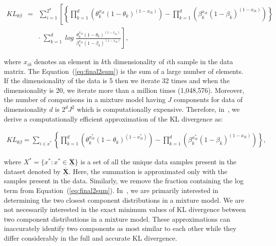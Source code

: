 \begin{eqnarray}
\label{eq:final2sum} 
KL_{\theta\beta} & = & \displaystyle \sum_{i=1}^{2^{{d}}} \left[ \left\{ \displaystyle \prod _{k=1}^{{d}}  \left(\theta_k^{x_{ik}}(1-\theta_{k})^{(1-x_{ik})} \right)  -\displaystyle \prod _{k=1}^{{d}} \left(  \beta_{k}^{x_{ik}}(1-\beta_{k})^{(1-x_{ik})} \right) \right\} \nonumber \right. \\ 
& & \left. \boldsymbol{\cdot} \; \displaystyle \sum_{k=1}^{{d}} \; log \; \frac{\theta_{k}^{x_{ik}} (1-\theta_{k})^{(1-x_{ik})}} { \beta_{k}^{x_{ik}}(1-\beta_{k})^{(1-x_{ik})}} \right],
\end{eqnarray}

where $x_{ik}$ denotes an element in
$k$th dimensionality of $i$th sample in the data matrix. The 
Equation~(\ref{eq:final2sum}) is the sum of a large number of elements. 
If the dimensionality of the data is 5 then we iterate 32 times and  
when the dimensionality is 20, we iterate more than a million times 
(1,048,576). Moreover, the number of comparisons in a mixture model
having $J$ components for data of dimensionality $d$ is $2^{d}J^{2}$ 
which is computationally expensive. Therefore, in~, we 
derive a computationally efficient approximation of the  KL divergence as:

\begin{eqnarray} 
\label{eq:symmcf}
KL_{\theta\beta}  =  \displaystyle \sum_{i \in x^{*} } \left\{ \displaystyle \prod _{k=1}^{{d}}  \left(\theta_k^{x^{*}_{ik}}(1-\theta_{k})^{(1-x^{*}_{ik})} \right) -\displaystyle \prod _{k=1}^{{d}} \left(  \beta_{k}^{x^{*}_{ik}}(1-\beta_{k})^{(1-x_{ik})} \right) \right\},
\end{eqnarray}

where 
$X^{*}=\{x^{*}:x^{*}\in \overline{\underline{\boldsymbol{X}}}\}$ 
is a set of all the unique data samples present in  the dataset
denoted by $\overline{\underline{\boldsymbol{X}}}$. 
Here, the summation is approximated only with  
the samples present in the data.  Similarly, we remove  the fraction 
containing the log term from Equation~(\ref{eq:final2sum}). 
In~, we are primarily interested 
in determining  the two closest component distributions in a mixture 
model. We are not necessarily interested in the exact minimum values
of  KL divergence between two component distributions in a mixture  
model. These approximations can inaccurately identify two 
components  as most similar to each other while they differ 
considerably in the full and accurate KL divergence.  


